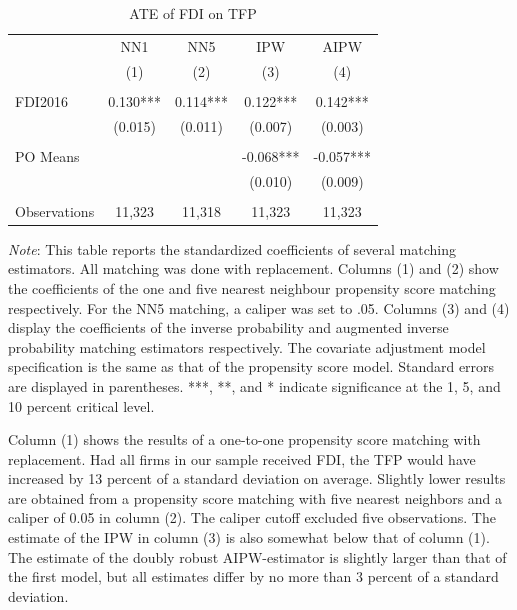 \documentclass[a4paper,11pt]{scrartcl}
\begin{document}
\begin{table}[h!]
 	\centering
   	\caption{ATE of FDI on TFP}
   	\label{tab:mainresults}
\begin{threeparttable}
	
 \begin{tabular}{l*{4}{c}}
	\hline
	\hline
 			& NN1 & NN5 & IPW & AIPW \\
 			& (1) & (2) & (3)  & (4) \\ \hline
 			&  &  &  &    \\
FDI2016 	& 0.130*** & 0.114*** & 0.122***  & 0.142***   \\
 			& (0.015) & (0.011) & (0.007) &   (0.003)  \\
 	&  &  &  &    \\
PO Means 	& & & -0.068*** &  -0.057*** \\
			&  &  & (0.010)  &  (0.009) \\
			&  &  &  &    \\
 Observations & 11,323 & 11,318 & 11,323 & 11,323 \\ 
 	\hline
 	\hline 
\end{tabular}

\begin{tablenotes}[flushleft]
      \footnotesize
\item \textit{Note}: This table reports the standardized coefficients of several matching estimators. All matching was done with replacement. Columns (1) and (2) show the coefficients of the one and five nearest neighbour propensity score matching respectively. For the NN5 matching, a caliper was set to .05. Columns (3) and (4) display the coefficients of the inverse probability and augmented inverse probability matching estimators respectively. The covariate adjustment model specification is the same as that of the propensity score model. Standard errors are displayed in parentheses. ***, **, and * indicate significance at the 1, 5, and 10 percent critical level.

\end{tablenotes}

\end{threeparttable}
\end{table}

Column (1) shows the results of a one-to-one propensity score matching with replacement. Had all firms in our sample received FDI, the TFP would have increased by 13 percent of a standard deviation on average. Slightly lower results are obtained from a propensity score matching with five nearest neighbors and a caliper of 0.05 in column (2). The caliper cutoff excluded five observations. The estimate of the IPW in column (3) is also somewhat below that of column (1). The estimate of the doubly robust AIPW-estimator is slightly larger than that of the first model, but all estimates differ by no more than 3 percent of a standard deviation.
\end{document}
